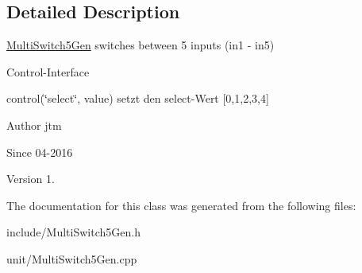 \subsection{Detailed Description}
\hyperlink{classunit_1_1MultiSwitch5Gen}{Multi\+Switch5\+Gen} switches between 5 inputs (in1 -\/ in5)

Control-\/\+Interface


\begin{DoxyItemize}
\item control(\char`\"{}select\char`\"{}, value) setzt den select-\/\+Wert \mbox{[}0,1,2,3,4\mbox{]}
\end{DoxyItemize}

\begin{DoxyAuthor}{Author}
jtm 
\end{DoxyAuthor}
\begin{DoxySince}{Since}
04-\/2016 
\end{DoxySince}
\begin{DoxyVersion}{Version}
1. 
\end{DoxyVersion}


The documentation for this class was generated from the following files\+:\begin{DoxyCompactItemize}
\item 
include/Multi\+Switch5\+Gen.\+h\item 
unit/Multi\+Switch5\+Gen.\+cpp\end{DoxyCompactItemize}
